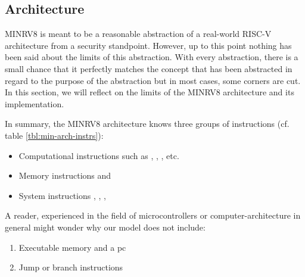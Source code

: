 \subsection{Architecture}
\label{sec:discuss-arch}

MINRV8 is meant to be a reasonable abstraction of a real-world RISC-V architecture from a security standpoint.
However, up to this point nothing has been said about the limits of this abstraction.
With every abstraction, there is a small chance that it perfectly matches the concept that has been abstracted in regard to the purpose of the abstraction but in most cases, some corners are cut.
In this section, we will reflect on the limits of the MINRV8 architecture and its implementation.

In summary, the MINRV8 architecture knows three groups of instructions (cf. table \ref{tbl:min-arch-instrs}):
\begin{itemize}
    \item Computational instructions such as , , , etc.
    \item Memory instructions  and 
    \item System instructions , , , 
\end{itemize}

A reader, experienced in the field of microcontrollers or computer-architecture in general might wonder why our model does not include:
\begin{enumerate}
    \item Executable memory and a \gls{pc}
    \item Jump or branch instructions
\end{enumerate}

